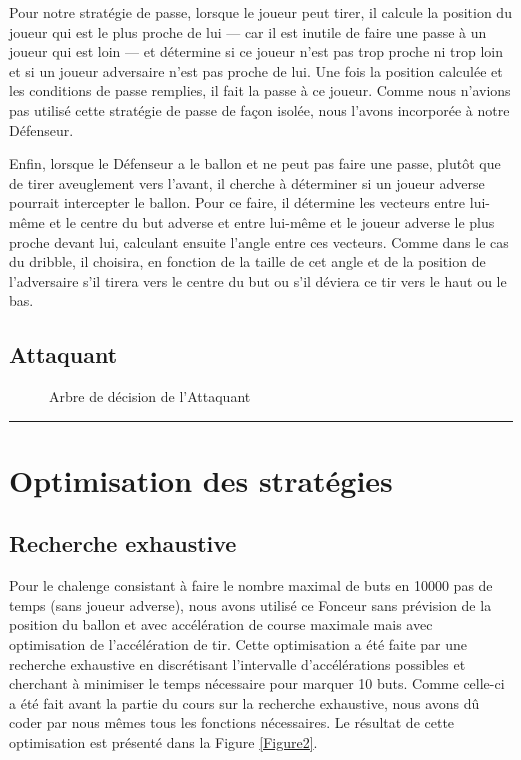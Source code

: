 \documentclass[a4paper,12pt]{article}
\numberwithin{equation}{section}
\begin{document}
Pour notre stratégie de passe, lorsque le joueur peut tirer, il calcule la position du joueur qui est le plus proche de lui --- car il est inutile de faire une passe à un joueur qui est loin --- et détermine si ce joueur n'est pas trop proche ni trop loin et si un joueur adversaire n'est pas proche de lui. Une fois la position calculée et les conditions de passe remplies, il fait la passe à ce joueur. Comme nous n'avions pas utilisé cette stratégie de passe de façon isolée, nous l'avons incorporée à notre Défenseur.

Enfin, lorsque le Défenseur a le ballon et ne peut pas faire une passe, plutôt que de tirer aveuglement vers l'avant, il cherche à déterminer si un joueur adverse pourrait intercepter le ballon. Pour ce faire, il détermine les vecteurs entre lui-même et le centre du but adverse et entre lui-même et le joueur adverse le plus proche devant lui, calculant ensuite l'angle entre ces vecteurs. Comme dans le cas du dribble, il choisira, en fonction de la taille de cet angle et de la position de l'adversaire s'il tirera vers le centre du but ou s'il déviera ce tir vers le haut ou le bas.

\subsection{Attaquant}

\begin{figure}[ht]
\centering

\caption{Arbre de décision de l'Attaquant}
\label{Figure7}
\end{figure}







\noindent \textcolor{red}{\rule{\textwidth}{0.5cm}}







\section{Optimisation des stratégies}
\label{4}


\subsection{Recherche exhaustive}

Pour le chalenge consistant à faire le nombre maximal de buts en 10000 pas de temps (sans joueur adverse), nous avons utilisé ce Fonceur sans prévision de la position du ballon et avec accélération de course maximale mais avec optimisation de l'accélération de tir. Cette optimisation a été faite par une recherche exhaustive en discrétisant l’intervalle d'accélérations possibles et cherchant à minimiser le temps nécessaire pour marquer 10 buts. Comme celle-ci a été fait avant la partie du cours sur la recherche exhaustive, nous avons dû coder par nous mêmes tous les fonctions nécessaires. Le résultat de cette optimisation est présenté dans la Figure \ref{Figure2}. 
\end{document}
